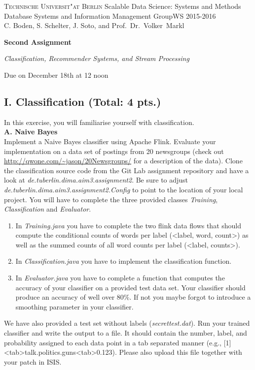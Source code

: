 \documentclass[11pt,a4paper]{article}
\begin{document}
\textsc{Technische Universit"at Berlin}{\small\hfill 
Scalable Data Science: Systems and Methods }\\
{\small Database Systems and Information Management Group{\small\hfill WS 2015-2016}\\
C. Boden, S. Schelter, J. Soto, and Prof.~Dr.~Volker~Markl}

\bigskip
\centerline{\Large\textbf{Second Assignment}}
\centerline{\emph{{Classification, Recommender Systems, and Stream Processing}}}
\centerline{Due on December 18th at 12 noon}
\bigskip


\subsection*{I. Classification (Total: 4 pts.)}
In this exercise, you will familiarise yourself with classification.\\ 

\textbf{A. Naive Bayes}\\

Implement a Naive Bayes classifier using Apache Flink. Evaluate your implementation on a data set of postings from 20 newsgroups (check out \url{http://qwone.com/~jason/20Newsgroups/} for a description of the data). Clone the classification source code from the Git Lab assignment repository and have a look at \textit{de.tuberlin.dima.aim3.assignment2}. Be sure to adjust \textit{de.tuberlin.dima.aim3.assignment2.Config} to point to the location of your local project. You will have to complete the three provided classes \textit{Training}, \textit{Classification} and \textit{Evaluator}. 

\begin{enumerate}
	\item In \emph{Training.java} you have to complete the two flink data flows that should compute the conditional counts of words per label (<label, word, count>) as well as the summed counts of all word counts per label (<label, counts>).
	\item In \emph{Classification.java} you have to implement the classification function.
	\item  In \emph{Evaluator.java} you have to complete a function that computes the accuracy of your classifier on a provided test data set. Your classifier should produce an accuracy of well over 80\%. If not you maybe forgot to introduce a smoothing parameter in your classifier.
\end{enumerate}

We have also provided a test set without labels (\textit{secrettest.dat}). Run your trained classifier and write the output to a file. It should contain the number, label, and probability assigned to each data point in a tab separated manner (e.g., [1]<tab>talk.politics.guns<tab>0.123). Please also upload this file together with your patch in ISIS. \\
\end{document}
